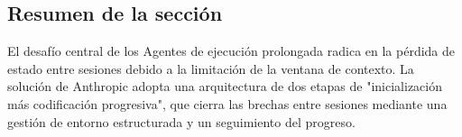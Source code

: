 \subsection{Resumen de la sección}

El desafío central de los Agentes de ejecución prolongada radica en la pérdida de estado entre sesiones debido a la limitación de la ventana de contexto. La solución de Anthropic adopta una arquitectura de dos etapas de "inicialización más codificación progresiva", que cierra las brechas entre sesiones mediante una gestión de entorno estructurada y un seguimiento del progreso.

